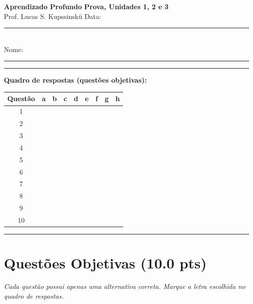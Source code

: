 \documentclass[11pt,a4paper]{article}
\begin{document}
{\Large\bfseries Aprendizado Profundo} \hfill \textbf{Prova, Unidades 1, 2 e 3}\\
Prof. Lucas S. Kupssinskü \hfill Data: \rule{3cm}{0.4pt}\\[0.4em]
Nome: \rule{12cm}{0.4pt}

\rule{\linewidth}{0.8pt}

\textbf{Quadro de respostas (questões objetivas):}\\[0.3em]
\begin{center}
\begin{tabular}{|c|c|c|c|c|c|c|c|c|}
\hline
\textbf{Questão} & \textbf{a} & \textbf{b} & \textbf{c} & \textbf{d} & \textbf{e} & \textbf{f} & \textbf{g} & \textbf{h} \\\hline
1  & & & & & & & & \\\hline
2  & & & & & & & & \\\hline
3  & & & & & & & & \\\hline
4  & & & & & & & & \\\hline
5  & & & & & & & & \\\hline
6  & & & & & & & & \\\hline
7  & & & & & & & & \\\hline
8  & & & & & & & & \\\hline
9  & & & & & & & & \\\hline
10 & & & & & & & & \\\hline
\end{tabular}
\end{center}

\rule{\linewidth}{0.4pt}

\section*{Questões Objetivas (10.0 pts)}
\textit{Cada questão possui apenas uma alternativa correta. Marque a letra escolhida no quadro de respostas.}
\end{document}
